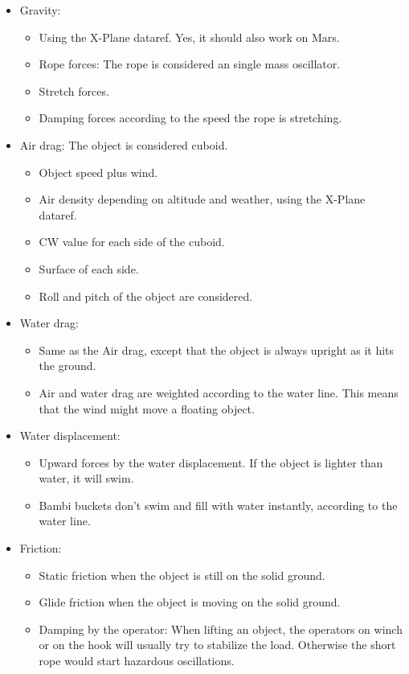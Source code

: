 \documentclass[10pt,a4]{scrartcl}
\begin{document}
\begin{itemize}
\item Gravity:
\begin{itemize}
\item Using the X-Plane dataref. Yes, it should also work on Mars.
\item Rope forces: The rope is considered an single mass oscillator.
\item Stretch forces.
\item Damping forces according to the speed the rope is stretching.
\end{itemize}
\item Air drag: The object is considered cuboid.
\begin{itemize}
\item Object speed plus wind.
\item Air density depending on altitude and weather, using the X-Plane dataref.
\item CW value for each side of the cuboid.
\item Surface of each side.
\item Roll and pitch of the object are considered.
\end{itemize}
\item Water drag:
\begin{itemize}
\item Same as the Air drag, except that the object is always upright as it hits the ground.
\item Air and water drag are weighted according to the water line. This means that the wind might move a floating object.
\end{itemize}
\item Water displacement:
\begin{itemize}
\item Upward forces by the water displacement. If the object is lighter than water, it will swim.
\item Bambi buckets don't swim and fill with water instantly, according to the water line.
\end{itemize}
\item Friction:
\begin{itemize}
\item Static friction when the object is still on the solid ground.
\item Glide friction when the object is moving on the solid ground.
\item Damping by the operator: When lifting an object, the operators on winch or on the hook will usually try to stabilize the load. Otherwise the short rope would start hazardous oscillations.

\end{itemize}
\end{itemize}
\end{document}
